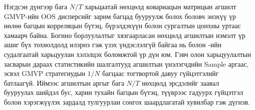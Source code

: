 Нэгдсэн дүнгээр бага $N/T$ харьцаатай нөхцөлд ковариацын матрицын агшилт GMVP-ийн OOS дисперсийг зарим багцад бууруулж болох боловч энэхүү үр нөлөө багцын корреляцын бүтэц, бүрэлдэхүүн болон сургалтын цонхны уртаас хамаарч байна. Богино борлуулалтыг хязгаарласан нөхцөлд агшилтын нэмэлт үр ашиг бүх тохиолдолд илэрнэ гэж үзэх үндэслэлгүй байгаа нь \citet{JagannathanMa2003} болон \citet{DeNardKostovic2026}-ийн судалгаатай харьцуулан хэлэлцэх боломжтой үр дүн юм. Гэвч олон харьцуулалтын засварын дараах статистикийн шалгалтууд агшилтын үнэлэгчдийн Sample аргаас, эсвэл GMVP стратегиудын $1/N$ багцаас тогтвортой давуу гүйцэтгэлийг батлаагүй. Иймээс агшилтын аргыг бага $N/T$ нөхцөлд эрсдэлийг заавал бууруулах шийдэл бус, харин тухайн багцын бүтэц, түүврээс гадуурх гүйцэтгэл болон хэрэгжүүлэх зардалд тулгуурлан сонгох шаардлагатай хувилбар гэж дүгнэв.
